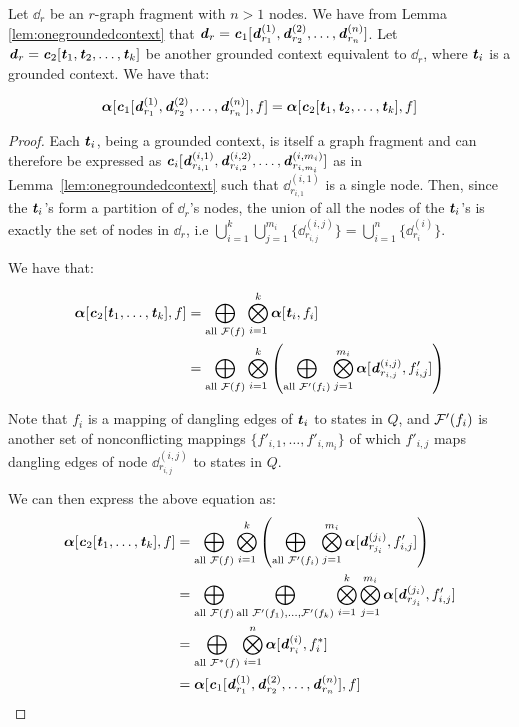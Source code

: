 \documentclass[11pt]{article}
\begin{document}
\begin{lemma}\label{lem:partialweightequivalence} Let $\dd_r$ be an $r$-graph
  fragment with $n>1$ nodes. We have from Lemma \ref{lem:onegroundedcontext}
  that $\dd_r = \cc_1[\dd^{(1)}_{r_1}, \dd^{(2)}_{r_2},\ldots,
  \dd^{(n)}_{r_n}]$. Let $ \dd_r = \cc_2[\tt_1, \tt_2, \ldots, \tt_k]$ be
  another grounded context equivalent to $\dd_r$, where $\tt_i$ is a grounded
  context. We have that:

  \[
    \aalpha[\cc_1[\dd^{(1)}_{r_1}, \dd^{(2)}_{r_2},\ldots,
    \dd^{(n)}_{r_n}],f] = \aalpha[\cc_2[\tt_1,\tt_2,\ldots,\tt_k],f]
  \]
\end{lemma}

\begin{proof}

  Each $\tt_i$, being a grounded context, is itself a graph fragment and can
  therefore be expressed as $\cc_i[\dd^{(i,1)}_{r_{i,1}},
  \dd^{(i,2)}_{r_{i,2}},\ldots, \dd^{(i,m_i)}_{r_{i,m_i}}]$ as in
  Lemma~\ref{lem:onegroundedcontext} such that $\dd^{(i,1)}_{r_{i,1}}$ is a
  single node. Then, since the $\tt_i$'s form a partition of $\dd_r$'s nodes,
  the union of all the nodes of the $\tt_i$'s is exactly the set of nodes in
  $\dd_r$, i.e $\bigcup_{i=1}^k \bigcup_{j=1}^{m_i} \{\dd^{(i,j)}_{r_{i,j}}\} =
  \bigcup_{i=1}^n \{\dd^{(i)}_{r_i}\}$. 

  We have that:
  
  \begin{align*}
    \aalpha[\cc_2[\tt_1,\ldots,\tt_k],f] &= \bigoplus_{\text{all } \calF(f)} \bigotimes_{i=1}^k \aalpha[\tt_i, f_i]\\
    &= \bigoplus_{\text{all } \calF(f)} \bigotimes_{i=1}^k \left(\bigoplus_{\text{all } \calF'(f_i)} \bigotimes_{j=1}^{m_i} \aalpha[\dd^{(i,j)}_{r_{i,j}}, f'_{i,j}] \right)\\
  \end{align*}

  Note that $f_i$ is a mapping of dangling edges of $\tt_i$ to states in $Q$,
  and $\calF'(f_i)$ is another set of nonconflicting mappings $\{f'_{i,1},
  \ldots, f'_{i,m_i}\}$ of which $f'_{i,j}$ maps dangling edges of node
  $\dd^{(i,j)}_{r_{i,j}}$ to states in $Q$. 

  We can then express the above equation as:
  \begin{align*}
    \aalpha[\cc_2[\tt_1,\ldots,\tt_k],f] &= \bigoplus_{\text{all } \calF(f)} \bigotimes_{i=1}^k \left(\bigoplus_{\text{all } \calF'(f_i)} \bigotimes_{j=1}^{m_i} \aalpha[\dd^{(j_i)}_{r_{j_i}}, f'_{i,j}] \right)\\
    &= \bigoplus_{\text{all } \calF(f)} \bigoplus_{\text{all } \mathcal{F'}(f_1),\ldots, \mathcal{F'}(f_k) } \bigotimes_{i=1}^k \bigotimes_{j=1}^{m_i} \aalpha[\dd^{(j_i)}_{r_{j_i}}, f'_{i,j}] \\
    &= \bigoplus_{\text{all } \calF^*(f)}\bigotimes_{i=1}^n \aalpha[\dd^{(i)}_{r_{i}}, f^*_{i}] \\
    &= \aalpha[\cc_1[\dd^{(1)}_{r_1}, \dd^{(2)}_{r_2},\ldots,
    \dd^{(n)}_{r_n}],f] 
  \end{align*}


\end{proof}
\end{document}
